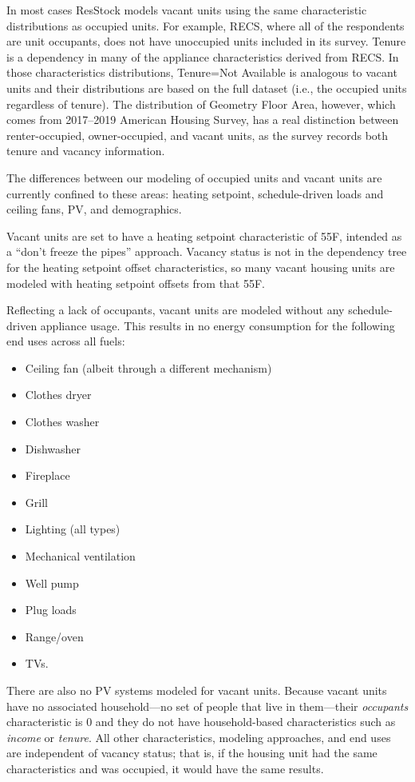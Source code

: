 In most cases ResStock models vacant units using the same characteristic distributions as occupied units. For example, RECS, where all of the respondents are unit occupants, does not have unoccupied units included in its survey. Tenure is a dependency in many of the appliance characteristics derived from RECS. In those characteristics distributions, Tenure=Not Available is analogous to vacant units and their distributions are based on the full dataset (i.e., the occupied units regardless of tenure). The distribution of Geometry Floor Area, however, which comes from 2017--2019 American Housing Survey, has a real distinction between renter-occupied, owner-occupied, and vacant units, as the survey records both tenure and vacancy information.

The differences between our modeling of occupied units and vacant units are currently confined to these areas: heating setpoint, schedule-driven loads and ceiling fans, PV, and demographics. 

Vacant units are set to have a heating setpoint characteristic of 55\degree F, intended as a ``don't freeze the pipes'' approach. Vacancy status is not in the dependency tree for the heating setpoint offset characteristics, so many vacant housing units are modeled with heating setpoint offsets from that 55\degree F. 

Reflecting a lack of occupants, vacant units are modeled without any schedule-driven appliance usage. This results in no energy consumption for the following end uses across all fuels:
\begin{itemize}
    \item Ceiling fan (albeit through a different mechanism)
    \item Clothes dryer
    \item Clothes washer
    \item Dishwasher
    \item Fireplace
    \item Grill
    \item Lighting (all types)
    \item Mechanical ventilation
    \item Well pump
    \item Plug loads
    \item Range/oven
    \item TVs.
\end{itemize}

There are also no PV systems modeled for vacant units. Because vacant units have no associated household---no set of people that live in them---their \textit{occupants} characteristic is 0 and they do not have household-based characteristics such as \textit{income} or \textit{tenure}. All other characteristics, modeling approaches, and end uses are independent of vacancy status; that is, if the housing unit had the same characteristics and was occupied, it would have the same results. 

